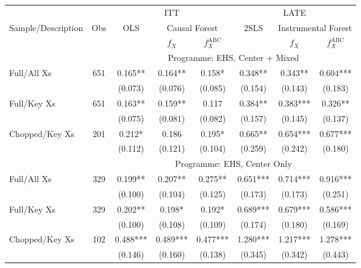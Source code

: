 \begin{tabular}{lccccccc}
\toprule 
\midrule 
\multicolumn{2}{c}{} & \multicolumn{3}{c}{ITT} & \multicolumn{3}{c}{LATE} \\
 \cmidrule(lr){3-5} \cmidrule(lr){6-8} 
Sample/Description & Obs & OLS & \multicolumn{2}{c}{Causal Forest} & 2SLS & \multicolumn{2}{c}{Instrumental Forest} \\
\multicolumn{3}{c}{} & $f_X$ & $f_X^{\text{ABC}}$ &  & $f_X$ & $f_X^{\text{ABC}}$ \\
\midrule 
 &  & \multicolumn{6}{c}{Programme: EHS, Center $+$ Mixed} \\
 \cmidrule(lr){3-8} 
Full/All Xs & 651 & 0.165** & 0.164** & 0.158* & 0.348** & 0.343** & 0.604*** \\
 &  & (0.073) & (0.076) & (0.085) & (0.154) & (0.143) & (0.183) \\
Full/Key Xs & 651 & 0.163** & 0.159** & 0.117 & 0.384** & 0.383*** & 0.326** \\
 &  & (0.075) & (0.081) & (0.082) & (0.157) & (0.145) & (0.137) \\
Chopped/Key Xs & 201 & 0.212* & 0.186 & 0.195* & 0.665** & 0.654*** & 0.677*** \\
 &  & (0.112) & (0.121) & (0.104) & (0.259) & (0.242) & (0.180) \\
\midrule 
 &  & \multicolumn{6}{c}{Programme: EHS, Center Only} \\
 \cmidrule(lr){3-8} 
Full/All Xs & 329 & 0.199** & 0.207** & 0.275** & 0.651*** & 0.714*** & 0.916*** \\
 &  & (0.100) & (0.104) & (0.125) & (0.173) & (0.173) & (0.251) \\
Full/Key Xs & 329 & 0.202** & 0.198* & 0.192* & 0.689*** & 0.679*** & 0.586*** \\
 &  & (0.100) & (0.108) & (0.109) & (0.174) & (0.180) & (0.169) \\
Chopped/Key Xs & 102 & 0.488*** & 0.489*** & 0.477*** & 1.280*** & 1.217*** & 1.278*** \\
 &  & (0.146) & (0.160) & (0.138) & (0.345) & (0.342) & (0.443) \\
\midrule 
\bottomrule 
\end{tabular}
